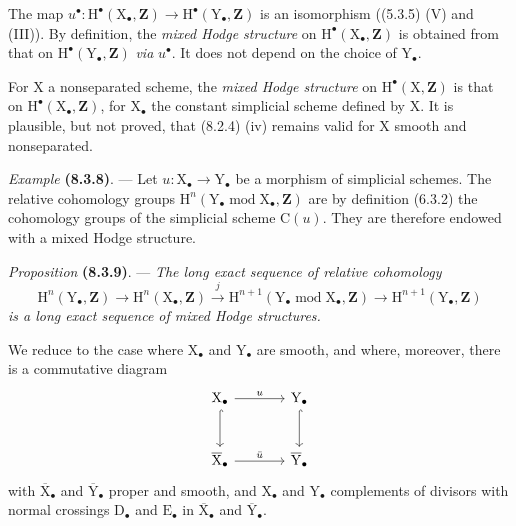 \documentclass[11pt,leqno]{article}
\begin{document}
The map \(u^\bullet:\mathrm{H}^\bullet(\mathrm{X}_\bullet,\mathbf{Z})\to\mathrm{H}^\bullet(\mathrm{Y}_\bullet,\mathbf{Z})\) is an isomorphism ((5.3.5) (V) and (III)). By definition, the \textit{mixed Hodge structure} on \(\mathrm{H}^\bullet(\mathrm{X}_\bullet,\mathbf{Z})\) is obtained from that on \(\mathrm{H}^\bullet(\mathrm{Y}_\bullet,\mathbf{Z})\) \textit{via} \(u^\bullet\). It does not depend on the choice of \(\mathrm{Y}_\bullet\).

For \(\mathrm{X}\) a nonseparated scheme, the \textit{mixed Hodge structure} on \(\mathrm{H}^\bullet(\mathrm{X},\mathbf{Z})\) is that on \(\mathrm{H}^\bullet(\mathrm{X}_\bullet,\mathbf{Z})\), for \(\mathrm{X}_\bullet\) the constant simplicial scheme defined by \(\mathrm{X}\). It is plausible, but not proved, that (8.2.4) (iv) remains valid for \(\mathrm{X}\) smooth and nonseparated.

\textit{Example} \textbf{(8.3.8)}. — Let \(u:\mathrm{X}_\bullet\to\mathrm{Y}_\bullet\) be a morphism of simplicial schemes. The relative cohomology groups \(\mathrm{H}^n(\mathrm{Y}_\bullet\operatorname{mod}\mathrm{X}_\bullet,\mathbf{Z})\) are by definition (6.3.2) the cohomology groups of the simplicial scheme \(\mathrm{C}(u)\). They are therefore endowed with a mixed Hodge structure.

\textit{Proposition} \textbf{(8.3.9)}. — \textit{The long exact sequence of relative cohomology}
\[
\mathrm{H}^n(\mathrm{Y}_\bullet,\mathbf{Z})
\to\mathrm{H}^n(\mathrm{X}_\bullet,\mathbf{Z})
\xrightarrow{j}
\mathrm{H}^{n+1}(\mathrm{Y}_\bullet\operatorname{mod}\mathrm{X}_\bullet,\mathbf{Z})
\to\mathrm{H}^{n+1}(\mathrm{Y}_\bullet,\mathbf{Z})
\]
\textit{is a long exact sequence of mixed Hodge structures.}

We reduce to the case where \(\mathrm{X}_\bullet\) and \(\mathrm{Y}_\bullet\) are smooth, and where, moreover, there is a commutative diagram
\[
\begin{tikzcd}[column sep=large,row sep=large]
\mathrm{X}_\bullet \arrow[r,"u"] \arrow[d,hook]
 & \mathrm{Y}_\bullet \arrow[d,hook]\\
\overline{\mathrm{X}}_\bullet \arrow[r,"\bar{u}"]
 & \overline{\mathrm{Y}}_\bullet
\end{tikzcd}
\]
with \(\overline{\mathrm{X}}_\bullet\) and \(\overline{\mathrm{Y}}_\bullet\) proper and smooth, and \(\mathrm{X}_\bullet\) and \(\mathrm{Y}_\bullet\) complements of divisors with normal crossings \(\mathrm{D}_\bullet\) and \(\mathrm{E}_\bullet\) in \(\overline{\mathrm{X}}_\bullet\) and \(\overline{\mathrm{Y}}_\bullet\).
\end{document}
